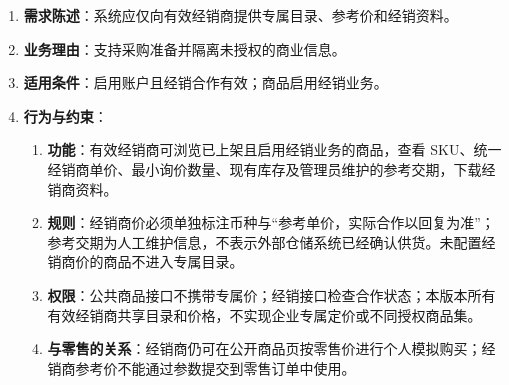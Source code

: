 \begin{enumerate}
\item {\bfseries 需求陈述}：系统应仅向有效经销商提供专属目录、参考价和经销资料。
\item {\bfseries 业务理由}：支持采购准备并隔离未授权的商业信息。
\item {\bfseries 适用条件}：启用账户且经销合作有效；商品启用经销业务。
\item {\bfseries 行为与约束}：
\begin{enumerate}
\item {\bfseries 功能}：有效经销商可浏览已上架且启用经销业务的商品，查看 SKU、统一经销商单价、最小询价数量、现有库存及管理员维护的参考交期，下载经销商资料。
\item {\bfseries 规则}：经销商价必须单独标注币种与“参考单价，实际合作以回复为准”；参考交期为人工维护信息，不表示外部仓储系统已经确认供货。未配置经销商价的商品不进入专属目录。
\item {\bfseries 权限}：公共商品接口不携带专属价；经销接口检查合作状态；本版本所有有效经销商共享目录和价格，不实现企业专属定价或不同授权商品集。
\item {\bfseries 与零售的关系}：经销商仍可在公开商品页按零售价进行个人模拟购买；经销商参考价不能通过参数提交到零售订单中使用。
\end{enumerate}

\end{enumerate}


